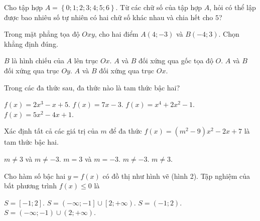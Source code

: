 \NQuestion Cho tập hợp $A=\left\{0;1;2;3;4;5;6\right\}$. Từ các chữ số của tập hợp $A$, hỏi có thể lập được bao nhiêu số tự nhiên có hai chữ số khác nhau và chia hết cho $5$?


\NQuestion Trong mặt phẳng tọa độ $Oxy$, cho hai điểm $A(4;-3)$ và $B(-4;3)$. Chọn khẳng định đúng.

\ChoicesTwoLines
{$B$ là hình chiếu của $A$ lên trục $Ox$.}
{$A$ và $B$ đối xứng qua gốc tọa độ $O$.}
{$A$ và $B$ đối xứng qua trục $Oy$.}
{$A$ và $B$ đối xứng qua trục $Ox$.}

\NQuestion Trong các đa thức sau, đa thức nào là tam thức bậc hai?

\ChoicesTwoLines
{$f\left(x\right)=2x^3-x+5$.}
{$f\left(x\right)=7x-3$.}
{$f\left(x\right)=x^4+2x^2-1$.}
{$f\left(x\right)=5x^2-4x+1$.}

\NQuestion Xác định tất cả các giá trị của $m$ để đa thức $f\left(x\right)=\left(m^2-9\right)x^2-2x+7$ là tam thức bậc hai.

\ChoicesTwoLines
{$m\ne 3$ và $m\ne -3$.}
{$m=3$ và $m=-3$.}
{$m\ne -3$.}
{$m\ne 3$.}

\NQuestion Cho hàm số bậc hai $y=f\left(x\right)$ có đồ thị như hình vẽ (hình 2). Tập nghiệm của bất phương trình $f\left(x\right)\le 0$ là

\begin{center}

\end{center}

\ChoicesTwoLines
{$S=\left[-1;2\right]$.}
{$S=\left(-\infty;-1\right]\cup\left[2;+\infty\right)$.}
{$S=\left(-1;2\right)$.}
{$S=\left(-\infty;-1\right)\cup\left(2;+\infty\right)$.}
